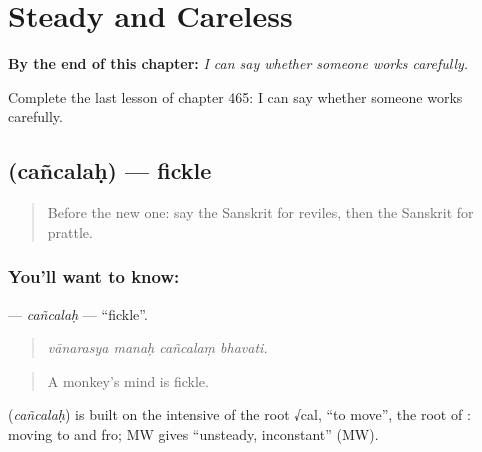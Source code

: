 
\chapter{Steady and Careless}
\label{ch:sa-steady-and-careless}

\begin{chapteropening}
\textbf{By the end of this chapter:} \emph{I can say whether someone works carefully.}

Complete the last lesson of chapter 465: I can say whether someone works carefully.
\end{chapteropening}

\section[\texorpdfstring{\sk{चञ्चलः} (cañcalaḥ)}{चञ्चलः (cañcalaḥ)}]{ (cañcalaḥ) — fickle}

\label{lesson:SA-C465-cancalah}



\begin{quote}
Before the new one: say the Sanskrit for reviles, then the Sanskrit for prattle.
\end{quote}

\subsection*{You'll want to know: }
\textbf{} — \emph{cañcalaḥ} — \textquotedblleft{}fickle\textquotedblright{}.

\begin{quote}
   
\end{quote}

\begin{quote}
\emph{vānarasya manaḥ cañcalaṃ bhavati.}
\end{quote}

\begin{quote}
A monkey's mind is fickle.
\end{quote}

\begin{cousinweb}
\textbf{} (\emph{cañcalaḥ}) is built on the intensive of the root √cal, \textquotedblleft{}to move\textquotedblright{}, the root of \textbf{}: moving to and fro; MW gives \textquotedblleft{}unsteady, inconstant\textquotedblright{} (MW).
\end{cousinweb}

